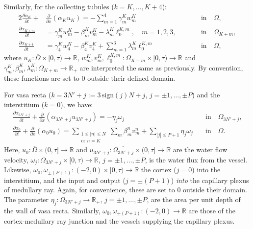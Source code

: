 \documentclass{article}
\begin{document}
Similarly, for the collecting tubules ($k=K,\dots,K+4$):
\begin{alignat}{2}
    \frac{\partial \alpha_K}{\partial t} + &\frac{\partial}{\partial x}(\alpha_Ku_K) = -\sum_{m=1}^4\gamma_m^Kw_{m}^K\qquad \qquad \ &&\text{in}\quad \Omega,\\
    \frac{\partial \alpha_{K+m}}{\partial t} &= \gamma_m^Kw_{m}^K-\beta_m^Kv_m^K-\lambda_m^K\ell_0^{K,m},\quad m=1,2,3,\qquad &&\text{in}\quad \Omega_{K+m},\\
    \frac{\partial \alpha_{K+4}}{\partial t} &= \gamma_4^Kw_{4}^K-\beta_4^Kv_4^K+\sum_{m=1}^3\lambda_m^K\ell_0^{K,m}\qquad \quad &&\text{in}\quad \Omega,
\end{alignat}
where $u_K:\overline{\Omega}\times[0,\tau)\to \mathbb{R}$,  $w_m^K,v_m^K,\ell_0^{K,m}:\Omega_{K+m}\times[0,\tau)\to \mathbb{R}$ and $\gamma_m^K,\beta_m^K,\lambda_m^K:\Omega_{K+m}\to \mathbb{R}_+$ are interpreted the same as previously.
By convention, these functions are set to $0$ outside their defined domain.

For vasa recta ($k=3N'+j:=3\,\mathrm{sign}(j)N+j$, $j=\pm 1,\dots,\pm P$) and the interstitium ($k=0$), we have:
\begin{align}
    \frac{\partial \alpha_{3N'+j}}{\partial t} + \frac{\partial}{\partial x}(\alpha_{3N'+j}u_{3N'+j}) = -\eta_{j}\omega_{j}\qquad &\text{in}\quad \Omega_{3N'+j},\\
    \frac{\partial \alpha_0}{\partial t} + \frac{\partial}{\partial x}(\alpha_0u_0) = 
        \sum_{\substack{1\leq|n|\leq N\\\text{or } n=K}}\sum_m\beta_m^nv_{m}^n+\sum_{|j|\leq P+1}\eta_j\omega_j \quad &\text{in}\quad \Omega.\label{eq:s_water}
\end{align}
Here, $u_0:\overline{\Omega}\times(0,\tau]\to \mathbb{R}$ and $u_{3N'+j}:\overline{\Omega_{3N'+j}}\times(0,\tau]\to \mathbb{R}$ are the water flow velocity, $\omega_j:\Omega_{3N'+j}\times[0,\tau)\to \mathbb{R}$, $j=\pm 1,\dots,\pm P$, is the water flux from the vessel.
Likewise, $\omega_0,\omega_{\pm(P+1)}:(-2,0)\times[0,\tau)\to \mathbb{R}$ the cortex ($j=0$) into the interstitium, and the input and output ($j=\pm(P+1)$) \textit{into} the capillary plexus of medullary ray.
Again, for convenience, these are set to $0$ outside their domain.
The parameter $\eta_j:\overline{\Omega_{3N'+j}}\to\mathbb{R}_+$, $j=\pm 1,\dots,\pm P$, are the area per unit depth of the wall of vasa recta.
Similarly, $\omega_0,\omega_{\pm(P+1)}:(-2,0)\to \mathbb{R}$ are those of the cortex-medullary ray junction and the vessels supplying the capillary plexus.
\end{document}
